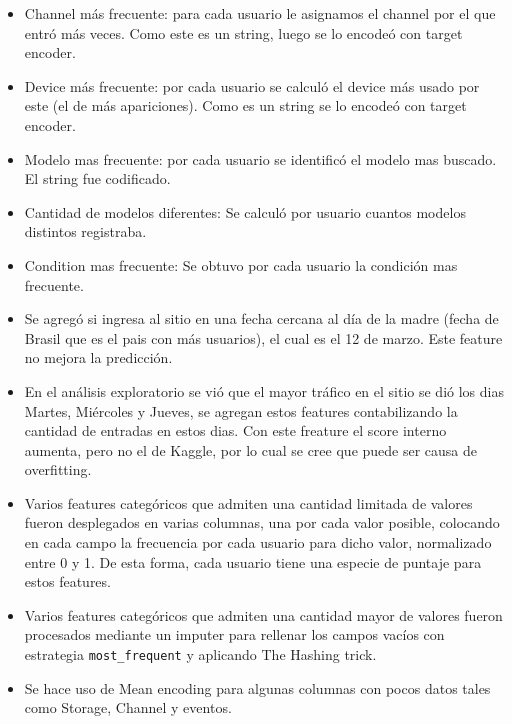 \documentclass[a4paper]{article}
\begin{document}
        \begin{itemize}
            \item Channel más frecuente: para cada usuario le asignamos el channel por el que entró más veces. Como este es un string, luego se lo encodeó con target encoder.\\
            
             \item Device más frecuente: por cada usuario se calculó el device más usado por este (el de más apariciones). Como es un string se lo encodeó con target encoder.\\
             
             \item Modelo mas frecuente: por cada usuario se identificó el modelo mas buscado. El string fue codificado.
             
             \item Cantidad de modelos diferentes: Se calculó por usuario cuantos modelos distintos registraba.
             
             \item Condition mas frecuente: Se obtuvo por cada usuario la condición mas frecuente.
             
             \item Se agregó si ingresa al sitio en una fecha cercana al día de la madre (fecha de Brasil que es el pais con más usuarios), el cual es el 12 de marzo. Este feature no mejora la predicción.
             
             \item En el análisis exploratorio se vió que el mayor tráfico en el sitio se dió los dias Martes, Miércoles y Jueves, se agregan estos features contabilizando la cantidad de entradas en estos dias. Con este freature el score interno aumenta, pero no el de Kaggle, por lo cual se cree que puede ser causa de overfitting.
             
             \item Varios features categóricos que admiten una cantidad limitada de valores fueron desplegados en varias columnas, una por cada valor posible, colocando en cada campo la frecuencia por cada usuario para dicho valor, normalizado entre 0 y 1. De esta forma, cada usuario tiene una especie de puntaje para estos features.
             
             \item Varios features categóricos que admiten una cantidad mayor de valores fueron procesados mediante un imputer para rellenar los campos vacíos con estrategia \texttt{most\_frequent} y aplicando The Hashing trick. 
             
             
             \item Se hace uso de Mean encoding para algunas columnas con pocos datos tales como Storage, Channel y eventos.
             
        \end{itemize}
        
\end{document}
